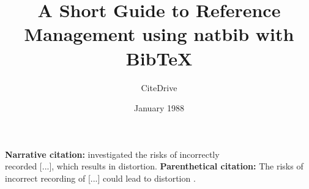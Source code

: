 \documentclass{article}
\title{A Short Guide to Reference Management using natbib with BibTeX}
\author{CiteDrive}
\date {January 1988}
\begin{document}
\maketitle
\textbf{Narrative citation:} \citet{Doe:1966} investigated the risks of incorrectly \\
recorded [...], which results in distortion.
\textbf{Parenthetical citation:} The risks of incorrect recording of [...] could lead to distortion \citep{Doe:1966}.


\medskip



\end{document}
